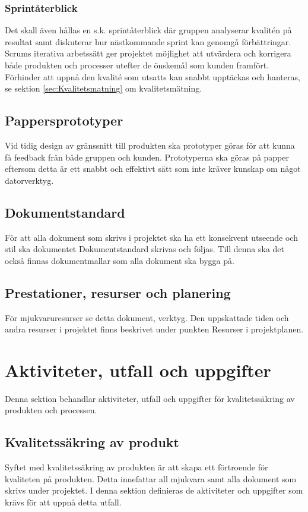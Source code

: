 \documentclass[a4paper,10pt]{article}
\begin{document}
\subsubsection{Sprintåterblick}
Det skall även hållas en s.k. sprintåterblick där gruppen analyserar kvalitén på resultat samt diskuterar hur nästkommande sprint kan genomgå förbättringar.
Scrums iterativa arbetssätt ger projektet möjlighet att utvärdera och korrigera både produkten och processer utefter de önskemål som kunden framfört. Förhinder att uppnå den kvalité som utsatts kan snabbt upptäckas och hanteras, se sektion \ref{sec:Kvalitetsmatning} om kvalitetsmätning.

\subsection{Pappersprototyper}
Vid tidig design av gränssnitt till produkten ska prototyper göras för att kunna få feedback från både gruppen och kunden. Prototyperna ska göras på papper eftersom detta är ett snabbt och effektivt sätt som inte kräver kunskap om något datorverktyg.

\subsection{Dokumentstandard}
För att alla dokument som skrivs i projektet ska ha ett konsekvent utseende och stil ska dokumentet Dokumentstandard skrivas och följas. Till denna ska det också finnas dokumentmallar som alla dokument ska bygga på.

\subsection{Prestationer, resurser och planering}
För mjukvaruresurser se detta dokument, verktyg.
Den uppskattade tiden och andra resurser i projektet finns beskrivet under punkten Resurser i projektplanen.

\section{Aktiviteter, utfall och uppgifter}
Denna sektion behandlar aktiviteter, utfall och uppgifter för kvalitetssäkring av produkten och processen.
\subsection{Kvalitetssäkring av produkt}
Syftet med kvalitetssäkring av produkten är att skapa ett förtroende för kvaliteten på produkten. Detta innefattar all mjukvara samt alla dokument som skrivs under projektet. I denna sektion definieras de aktiviteter och uppgifter som krävs för att uppnå detta utfall.
\end{document}
